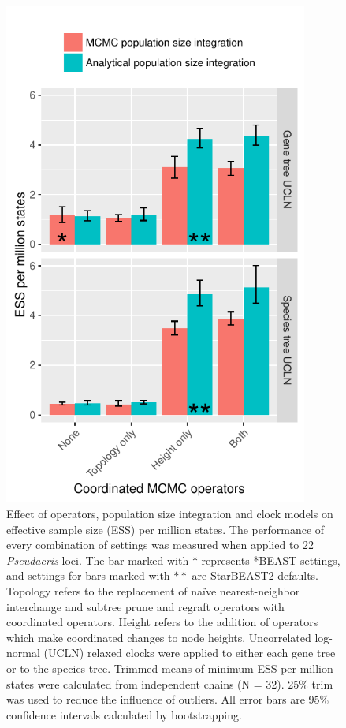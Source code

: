 \documentclass[12pt]{article}
\begin{document}
\begin{figure}[htb!]
\centering
\includegraphics[width=10cm]{minimum_ess_per_mstates.pdf}
\caption
{Effect of operators, population size integration and clock models on effective
sample size (ESS) per million states. The performance of every combination of
settings was measured when applied to 22 \textit{Pseudacris} loci. The bar
marked with $\ast$ represents *BEAST settings, and settings for bars marked with
$\ast\ast$ are StarBEAST2 defaults. Topology refers to the replacement of
na\"ive nearest-neighbor interchange and subtree prune and regraft operators
with coordinated operators. Height refers to the addition of operators which
make coordinated changes to node heights. Uncorrelated log-normal (UCLN) relaxed
clocks were applied to either each gene tree or to the species tree. Trimmed
means of minimum ESS per million states were calculated from independent chains
(N = 32). 25\% trim was used to reduce the influence of outliers. All error bars
are 95\% confidence intervals calculated by bootstrapping.}
\label{fig:realEssPerMstates}
\end{figure}
\end{document}
